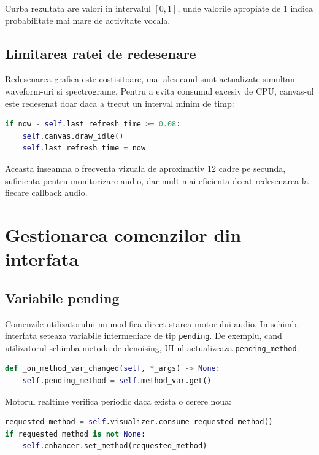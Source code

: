 \documentclass[12pt,a4paper]{article}
\begin{document}
Curba rezultata are valori in intervalul \([0,1]\), unde valorile apropiate de
1 indica probabilitate mai mare de activitate vocala.

\subsection{Limitarea ratei de redesenare}

Redesenarea grafica este costisitoare, mai ales cand sunt actualizate simultan
waveform-uri si spectrograme. Pentru a evita consumul excesiv de CPU, canvas-ul
este redesenat doar daca a trecut un interval minim de timp:

\begin{lstlisting}[language=Python]
if now - self.last_refresh_time >= 0.08:
    self.canvas.draw_idle()
    self.last_refresh_time = now
\end{lstlisting}

Aceasta inseamna o frecventa vizuala de aproximativ 12 cadre pe secunda, suficienta
pentru monitorizare audio, dar mult mai eficienta decat redesenarea la fiecare
callback audio.

\section{Gestionarea comenzilor din interfata}

\subsection{Variabile pending}

Comenzile utilizatorului nu modifica direct starea motorului audio. In schimb,
interfata seteaza variabile intermediare de tip \texttt{pending}. De exemplu,
cand utilizatorul schimba metoda de denoising, UI-ul actualizeaza
\texttt{pending\_method}:

\begin{lstlisting}[language=Python]
def _on_method_var_changed(self, *_args) -> None:
    self.pending_method = self.method_var.get()
\end{lstlisting}

Motorul realtime verifica periodic daca exista o cerere noua:

\begin{lstlisting}[language=Python]
requested_method = self.visualizer.consume_requested_method()
if requested_method is not None:
    self.enhancer.set_method(requested_method)
\end{lstlisting}
\end{document}
